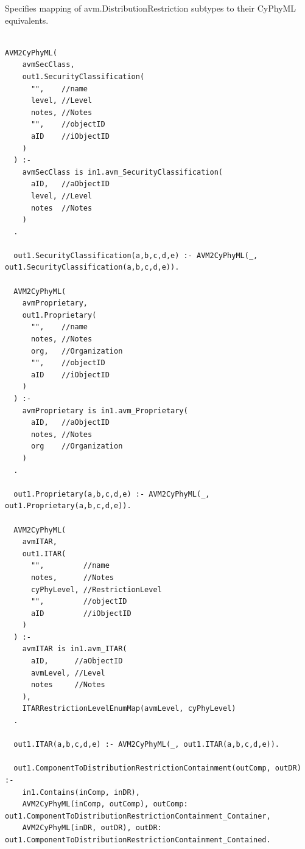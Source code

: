 Specifies mapping of avm.DistributionRestriction subtypes to their CyPhyML equivalents.
\begin{lstlisting}

AVM2CyPhyML(
    avmSecClass,
    out1.SecurityClassification(
      "",    //name
      level, //Level
      notes, //Notes
      "",    //objectID
      aID    //iObjectID
    )
  ) :-
    avmSecClass is in1.avm_SecurityClassification(
      aID,   //aObjectID
      level, //Level
      notes  //Notes
    )
  .

  out1.SecurityClassification(a,b,c,d,e) :- AVM2CyPhyML(_, out1.SecurityClassification(a,b,c,d,e)).

  AVM2CyPhyML(
    avmProprietary,
    out1.Proprietary(
      "",    //name
      notes, //Notes
      org,   //Organization
      "",    //objectID
      aID    //iObjectID
    )
  ) :-
    avmProprietary is in1.avm_Proprietary(
      aID,   //aObjectID
      notes, //Notes
      org    //Organization
    )
  .

  out1.Proprietary(a,b,c,d,e) :- AVM2CyPhyML(_, out1.Proprietary(a,b,c,d,e)).

  AVM2CyPhyML(
    avmITAR,
    out1.ITAR(
      "",         //name
      notes,      //Notes
      cyPhyLevel, //RestrictionLevel
      "",         //objectID
      aID         //iObjectID
    )
  ) :-
    avmITAR is in1.avm_ITAR(
      aID,      //aObjectID
      avmLevel, //Level
      notes     //Notes
    ),
    ITARRestrictionLevelEnumMap(avmLevel, cyPhyLevel)
  .

  out1.ITAR(a,b,c,d,e) :- AVM2CyPhyML(_, out1.ITAR(a,b,c,d,e)).

  out1.ComponentToDistributionRestrictionContainment(outComp, outDR) :-
    in1.Contains(inComp, inDR),
    AVM2CyPhyML(inComp, outComp), outComp: out1.ComponentToDistributionRestrictionContainment_Container,
    AVM2CyPhyML(inDR, outDR), outDR: out1.ComponentToDistributionRestrictionContainment_Contained.


\end{lstlisting}

